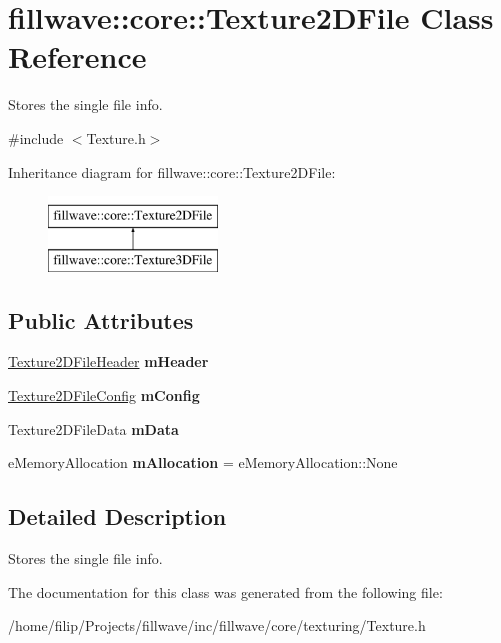 \hypertarget{classfillwave_1_1core_1_1Texture2DFile}{}\section{fillwave\+:\+:core\+:\+:Texture2\+D\+File Class Reference}
\label{classfillwave_1_1core_1_1Texture2DFile}


Stores the single file info.  




{\ttfamily \#include $<$Texture.\+h$>$}

Inheritance diagram for fillwave\+:\+:core\+:\+:Texture2\+D\+File\+:\begin{figure}[H]
\begin{center}
\leavevmode
\includegraphics[height=2.000000cm]{classfillwave_1_1core_1_1Texture2DFile}
\end{center}
\end{figure}
\subsection*{Public Attributes}
\begin{DoxyCompactItemize}
\item 
\hypertarget{classfillwave_1_1core_1_1Texture2DFile_a5068e8ca0085832cf00bb06fbe26bf26}{}\hyperlink{classfillwave_1_1core_1_1Texture2DFileHeader}{Texture2\+D\+File\+Header} {\bfseries m\+Header}\label{classfillwave_1_1core_1_1Texture2DFile_a5068e8ca0085832cf00bb06fbe26bf26}

\item 
\hypertarget{classfillwave_1_1core_1_1Texture2DFile_aba5834514cf5f2ab820c1ba8b9514e43}{}\hyperlink{classfillwave_1_1core_1_1Texture2DFileConfig}{Texture2\+D\+File\+Config} {\bfseries m\+Config}\label{classfillwave_1_1core_1_1Texture2DFile_aba5834514cf5f2ab820c1ba8b9514e43}

\item 
\hypertarget{classfillwave_1_1core_1_1Texture2DFile_a7206e6bee8aa7e9b6ff2f8b127d337b5}{}Texture2\+D\+File\+Data {\bfseries m\+Data}\label{classfillwave_1_1core_1_1Texture2DFile_a7206e6bee8aa7e9b6ff2f8b127d337b5}

\item 
\hypertarget{classfillwave_1_1core_1_1Texture2DFile_a62277de68640125e542a252274d3d0f0}{}e\+Memory\+Allocation {\bfseries m\+Allocation} = e\+Memory\+Allocation\+::\+None\label{classfillwave_1_1core_1_1Texture2DFile_a62277de68640125e542a252274d3d0f0}

\end{DoxyCompactItemize}


\subsection{Detailed Description}
Stores the single file info. 

The documentation for this class was generated from the following file\+:\begin{DoxyCompactItemize}
\item 
/home/filip/\+Projects/fillwave/inc/fillwave/core/texturing/Texture.\+h\end{DoxyCompactItemize}
